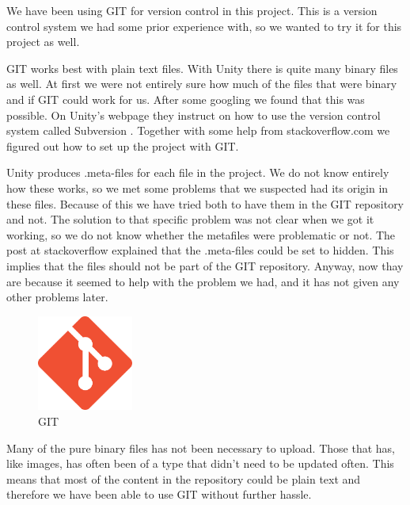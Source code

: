 We have been using GIT for version control in this project. This is a version
control system we had some prior experience with, so we wanted to try it for 
this project as well. 

GIT works best with plain text files. With Unity there is quite many binary
files as well. At first we were not entirely sure how much of the files that
were binary and if GIT could work for us. After some googling we found that 
this was possible. On Unity's webpage they instruct on how to use the version
control system called Subversion \cite{SubversionControl}. Together with some
help from stackoverflow.com\cite{gitVersionControl} we figured out how to set 
up the project with GIT.

Unity produces .meta-files for each file in the project. We do not know 
entirely how these works, so we met some problems that we suspected had its
origin in these files. Because of this we have tried both to have them in
the GIT repository and not. The solution to that specific problem was not
clear when we got it working, so we do not know whether the metafiles were
problematic or not. The post at stackoverflow explained that the .meta-files 
could be set to hidden. This implies that the files should not be part
of the GIT repository. Anyway, now thay are because it seemed to help with the
problem we had, and it has not given any other problems later.


\begin{figure}
	\capstart
	\centering
	\vspace{-10pt}
	\includegraphics[width=0.28\textwidth]{images/git}
	\vspace{-5pt}
	\caption[GIT logo]{GIT}
	\label{fig:git}
	\vspace{-10pt}
\end{figure}

Many of the pure binary files has not been necessary to upload. Those that
has, like images, has often been of a type that didn't need to be updated
often. This means that most of the content in the repository could be plain
text and therefore we have been able to use GIT without further hassle.

